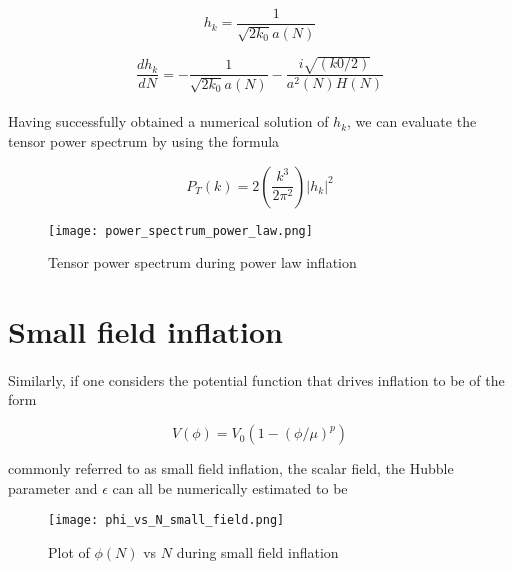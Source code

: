 \documentclass[12pt,a4paper,oneside]{book}
\begin{document}
\begin{equation}
h_k  = \frac{1}{\sqrt{2k_0}a(N)}
\end{equation}

\begin{equation}
\frac{dh_k}{dN} = -\frac{1}{\sqrt{2k_0}a(N)} - \frac{i\sqrt{(k0/2)}}{a^2(N)H(N)}
\end{equation}

\paragraph*{} Having successfully obtained a numerical solution of $h_k$, we can evaluate the tensor power spectrum by using the formula

\begin{equation}
P_T(k) = 2 (\frac{k^3}{2\pi^2}) |h_k|^2
\end{equation}

\begin{figure}
\begin{center}
\texttt{[image: power\_spectrum\_power\_law.png]}
\caption[Tensor power spectrum during power law inflation]{Tensor power spectrum during power law inflation}
\label{blah}
\end{center}
\end{figure}

\section{Small field inflation}

\paragraph*{} Similarly, if one considers the potential function that drives inflation to be of the form

\begin{equation}
V(\phi) = V_0(1-(\phi/\mu)^p)
\end{equation}

\noindent commonly referred to as small field inflation, the scalar field, the Hubble parameter and $\epsilon$ can all be numerically estimated to be

\begin{figure}
\begin{center}
\texttt{[image: phi\_vs\_N\_small\_field.png]}
\caption[Plot of $\phi(N)$ vs $N$ during small field inflation]{Plot of $\phi(N)$ vs $N$ during small field inflation}
\label{blah}
\end{center}
\end{figure}
\end{document}
